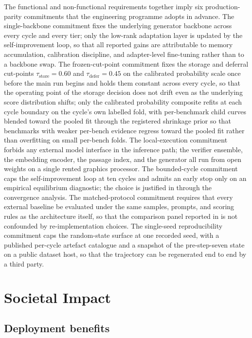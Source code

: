 The functional and non-functional requirements together imply six production-parity commitments that the engineering programme adopts in advance. The single-backbone commitment fixes the underlying generator backbone across every cycle and every tier; only the low-rank adaptation layer is updated by the self-improvement loop, so that all reported gains are attributable to memory accumulation, calibration discipline, and adapter-level fine-tuning rather than to a backbone swap. The frozen-cut-point commitment fixes the storage and deferral cut-points $\tau_{\text{store}} = 0.60$ and $\tau_{\text{defer}} = 0.45$ on the calibrated probability scale once before the main run begins and holds them constant across every cycle, so that the operating point of the storage decision does not drift even as the underlying score distribution shifts; only the calibrated probability composite refits at each cycle boundary on the cycle's own labelled fold, with per-benchmark child curves blended toward the pooled fit through the registered shrinkage prior so that benchmarks with weaker per-bench evidence regress toward the pooled fit rather than overfitting on small per-bench folds. The local-execution commitment forbids any external model interface in the inference path; the verifier ensemble, the embedding encoder, the passage index, and the generator all run from open weights on a single rented graphics processor. The bounded-cycle commitment caps the self-improvement loop at ten cycles and admits an early stop only on an empirical equilibrium diagnostic; the choice is justified in  through the convergence analysis. The matched-protocol commitment requires that every external baseline be evaluated under the same samples, prompts, and scoring rules as the architecture itself, so that the comparison panel reported in  is not confounded by re-implementation choices. The single-seed reproducibility commitment caps the random-state surface at one recorded seed, with a published per-cycle artefact catalogue and a snapshot of the pre-step-seven state on a public dataset host, so that the trajectory can be regenerated end to end by a third party.

\section{Societal Impact}
\label{sec:societal-impact}

\subsection{Deployment benefits}
\label{sec:soc-benefits}


